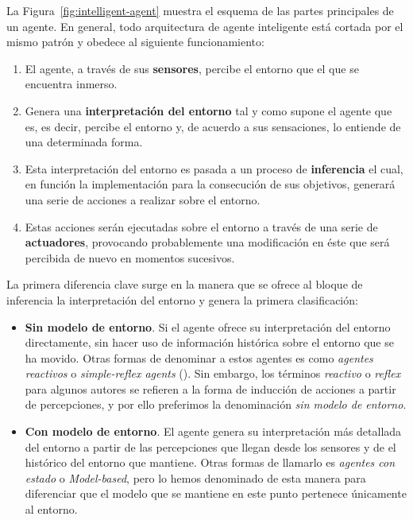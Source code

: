 La Figura~\ref{fig:intelligent-agent} muestra el esquema de las partes principales de un agente. En general, todo arquitectura de agente inteligente está cortada por el mismo patrón y obedece al siguiente funcionamiento:

\begin{enumerate}
	\item El agente, a través de sus \textbf{sensores}, percibe el entorno que el que se encuentra inmerso.
	\item Genera una \textbf{interpretación del entorno} tal y como supone el agente que es, es decir, percibe el entorno y, de acuerdo a sus sensaciones, lo entiende de una determinada forma.
	\item Esta interpretación del entorno es pasada a un proceso de \textbf{inferencia} el cual, en función la implementación para la consecución de sus objetivos, generará una serie de acciones a realizar sobre el entorno.
	\item Estas acciones serán ejecutadas sobre el entorno a través de una serie de \textbf{actuadores}, provocando probablemente una modificación en éste que será percibida de nuevo en momentos sucesivos.
\end{enumerate}

La primera diferencia clave surge en la manera que se ofrece al bloque de inferencia la interpretación del entorno y genera la primera clasificación:

\begin{itemize}
	\item \textbf{Sin modelo de entorno}. Si el agente ofrece su interpretación del entorno directamente, sin hacer uso de información histórica sobre el entorno que se ha movido. Otras formas de denominar a estos agentes es como \textit{agentes reactivos} o \textit{simple-reflex agents} (\cite{russell2003artificial}). Sin embargo, los términos \textit{reactivo} o \textit{reflex} para algunos autores se refieren a la forma de inducción de acciones a partir de percepciones, y por ello preferimos la denominación \textit{sin modelo de entorno}.
	\item \textbf{Con modelo de entorno}. El agente genera su interpretación más detallada del entorno a partir de las percepciones que llegan desde los sensores y de el histórico del entorno que mantiene. Otras formas de llamarlo es \textit{agentes con estado} o \textit{Model-based}, pero lo hemos denominado de esta manera para diferenciar que el modelo que se mantiene en este punto pertenece únicamente al entorno.
\end{itemize}

